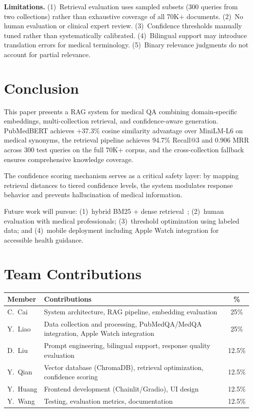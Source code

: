 \documentclass[11pt,a4paper]{article}
\begin{document}
\textbf{Limitations.} (1)~Retrieval evaluation uses sampled subsets (300 queries from two collections) rather than exhaustive coverage of all 70K+ documents. (2)~No human evaluation or clinical expert review. (3)~Confidence thresholds manually tuned rather than systematically calibrated. (4)~Bilingual support may introduce translation errors for medical terminology. (5)~Binary relevance judgments do not account for partial relevance.

\section{Conclusion}

This paper presents a RAG system for medical QA combining domain-specific embeddings, multi-collection retrieval, and confidence-aware generation. PubMedBERT achieves +37.3\% cosine similarity advantage over MiniLM-L6 on medical synonyms, the retrieval pipeline achieves 94.7\% Recall@3 and 0.906 MRR across 300 test queries on the full 70K+ corpus, and the cross-collection fallback ensures comprehensive knowledge coverage.

The confidence scoring mechanism serves as a critical safety layer: by mapping retrieval distances to tiered confidence levels, the system modulates response behavior and prevents hallucination of medical information.

Future work will pursue: (1)~hybrid BM25 + dense retrieval~\citep{robertson2009probabilistic}; (2)~human evaluation with medical professionals; (3)~threshold optimization using labeled data; and (4)~mobile deployment including Apple Watch integration for accessible health guidance.

\section*{Team Contributions}

\noindent
\small
\begin{tabular}{@{}llc@{}}
\toprule
\textbf{Member} & \textbf{Contributions} & \textbf{\%} \\
\midrule
C.~Cai   & System architecture, RAG pipeline, embedding evaluation & 25\% \\
Y.~Liao  & Data collection and processing, PubMedQA/MedQA integration, Apple Watch integration & 25\% \\
D.~Liu   & Prompt engineering, bilingual support, response quality evaluation & 12.5\% \\
Y.~Qian  & Vector database (ChromaDB), retrieval optimization, confidence scoring & 12.5\% \\
Y.~Huang & Frontend development (Chainlit/Gradio), UI design & 12.5\% \\
Y.~Wang  & Testing, evaluation metrics, documentation & 12.5\% \\
\bottomrule
\end{tabular}
\end{document}
